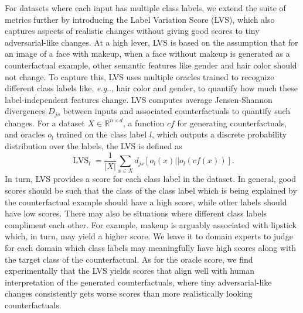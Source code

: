 \documentclass[11pt,a4paper,twoside,openright,final]{memoir}
\makeatletter
\DeclareRobustCommand\onedot{\futurelet\@let@token\@onedot}
\def\@onedot{\ifx\@let@token.\else.\null\fi\xspace}
\def\eg{\emph{e.g}\onedot} \def\Eg{\emph{E.g}\onedot}
\makeatother
\begin{document}
For datasets where each input has multiple class labels, we extend the suite of metrics further by introducing the Label Variation Score (LVS), which also captures aspects of realistic changes without giving good scores to tiny adversarial-like changes.
At a high lever, LVS is based on the assumption that for an image of a face with makeup, when a face without makeup is generated as a counterfactual example, other semantic features like gender and hair color should not change.
To capture this, LVS uses multiple oracles trained to recognize different class labels like, \eg, hair color and gender, to quantify how much these label-independent features change. 
LVS computes average Jensen-Shannon divergences $D_{js}$ between inputs and associated counterfactuals to quantify such changes.
For a dataset $X\in \mathbb{R}^{n\times d}$, a function $cf$ for generating counterfactuals, and oracles $o_l$ trained on the class label $l$, which outputs a discrete probability distribution over the labels, the LVS is defined as 
\begin{equation}\label{eq:lvs}
   \operatorname{LVS}_l = \frac{1}{|X|} \sum_{x \in X} d_{js}\left[ o_l(x) || o_l(cf(x))\right].
\end{equation}
In turn, LVS provides a score for each class label in the dataset.
In general, good scores should be such that the class of the class label which is being explained by the counterfactual example should have a high score, while other labels should have low scores.
There may also be situations where different class labels compliment each other. 
For example, makeup is arguably associated with lipstick which, in turn, may yield a higher score.
We leave it to domain experts to judge for each domain which class labels may meaningfully have high scores along with the target class of the counterfactual. 
As for the oracle score, we find experimentally that the LVS yields scores that align well with human interpretation of the generated counterfactuals, where tiny adversarial-like changes consistently gets worse scores than more realistically looking counterfactuals.
\end{document}

